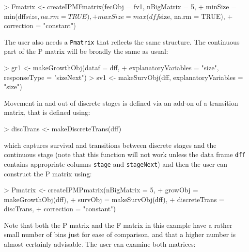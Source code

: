\documentclass{article}
\begin{document}
\begin{Schunk}
\begin{Sinput}
> Fmatrix <- createIPMFmatrix(fecObj = fv1, nBigMatrix = 5, 
+                             minSize = min(dff$size, na.rm = TRUE), 
+                             maxSize = max(dff$size, na.rm = TRUE), 
+                             correction = "constant")
\end{Sinput}
\end{Schunk}
The user also needs a {\tt Pmatrix} that reflects the same structure. The continuous part of the P matrix will be broadly the same as usual:
\begin{Schunk}
\begin{Sinput}
> gr1 <- makeGrowthObj(dataf = dff, 
+                      explanatoryVariables = "size", responseType = "sizeNext")
> sv1 <- makeSurvObj(dff, explanatoryVariables = "size")
\end{Sinput}
\end{Schunk}
Movement in and out of discrete stages is defined via an add-on of a transition matrix, that is defined using: 
\begin{Schunk}
\begin{Sinput}
> discTrans <- makeDiscreteTrans(dff)
\end{Sinput}
\end{Schunk}
which captures survival and transitions between discrete stages and the continuous stage (note that this function will not work unless the data frame {\tt dff} contains appropriate columns {\tt stage} and {\tt stageNext}) and then the user can construct the P matrix using: 
\begin{Schunk}
\begin{Sinput}
> Pmatrix <- createIPMPmatrix(nBigMatrix = 5, 	
+                             growObj = makeGrowthObj(dff), 
+                             survObj = makeSurvObj(dff), 
+                             discreteTrans = discTrans, 
+                             correction = "constant")
\end{Sinput}
\end{Schunk}
Note that both the P matrix and the F matrix in this example have a rather small number of bins just for ease of comparison, and that a higher number is almost certainly advisable. The user can examine both matrices: 
\end{document}
